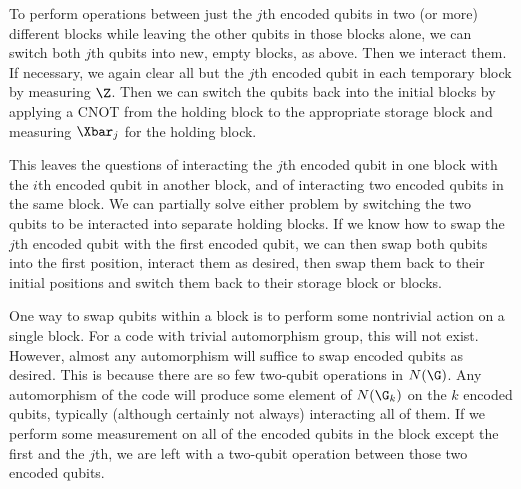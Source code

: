 To perform operations between just the $j$th encoded qubits in two (or
more) different blocks while leaving the other qubits in those blocks alone,
we can switch both $j$th qubits into new, empty blocks, as above.  Then
we interact them.  If necessary, we again clear all but the $j$th encoded
qubit in each temporary block by measuring $\Z$.  Then we can switch the
qubits back into the initial blocks by applying a CNOT from the holding
block to the appropriate storage block and measuring $\Xbar_j$ for the
holding block.

This leaves the questions of interacting the $j$th encoded qubit in one block
with the $i$th encoded qubit in another block, and of interacting two encoded
qubits in the same block.  We can partially solve either problem by switching
the two qubits to be interacted into separate holding blocks.  If we know how
to swap the $j$th encoded qubit with the first encoded qubit, we can then
swap both qubits into the first position, interact them as desired, then
swap them back to their initial positions and switch them back to their
storage block or blocks.

One way to swap qubits within a block is to perform some nontrivial action
on a single block.  For a code with trivial automorphism group, this will not
exist.  However, almost any automorphism will suffice to swap encoded
qubits as desired.  This is because there are so few two-qubit operations in
$N(\G)$.  Any automorphism of the code will produce some element of
$N(\G_k)$ on the $k$ encoded qubits, typically (although certainly not
always) interacting all of them.  If we perform some measurement on all of
the encoded qubits in the block except the first and the $j$th, we are left
with a two-qubit operation between those two encoded qubits.

